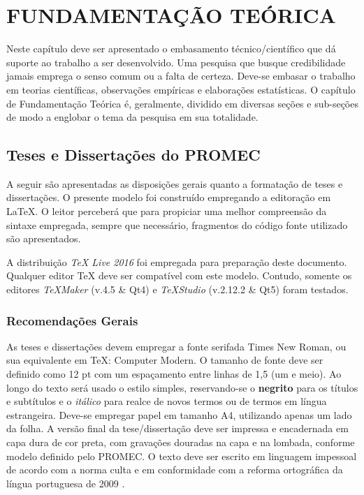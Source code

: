 \chapter{FUNDAMENTAÇÃO TEÓRICA}\label{cap:intro}

Neste capítulo deve ser apresentado o embasamento técnico/científico que dá suporte ao trabalho a ser desenvolvido. Uma pesquisa que busque credibilidade jamais emprega o senso comum ou a falta de certeza. Deve-se embasar o trabalho em teorias científicas, observações empíricas e elaborações estatísticas. O capítulo de Fundamentação Teórica é, geralmente, dividido em diversas seções e sub-seções de modo a englobar o tema da pesquisa em sua totalidade.

\section{Teses e Dissertações do PROMEC}

A seguir são apresentadas as disposições gerais quanto a formatação de teses e dissertações. O presente modelo foi construído empregando a editoração em {\LaTeX}. O leitor perceberá que para propiciar uma melhor compreensão da sintaxe empregada, sempre que necessário, fragmentos do código fonte utilizado são apresentados.

A distribuição \textit{{\TeX} Live 2016} \citep{rahtz2016livetex} foi empregada para preparação deste documento. Qualquer editor {\TeX} deve ser compatível com este modelo. Contudo, somente os editores \textit{{\TeX}Maker} (v.4.5 \& Qt4) e \textit{{\TeX}Studio} (v.2.12.2 \& Qt5) foram testados.

\subsection{Recomendações Gerais}

As teses e dissertações devem empregar a fonte serifada Times New Roman, ou sua equivalente em {\TeX}: Computer Modern. O tamanho de fonte deve ser definido como 12 pt com um espaçamento entre linhas de 1,5 (um e meio). Ao longo do texto será usado o estilo simples, reservando-se o \textbf{negrito} para os títulos e subtítulos e o \textit{itálico} para realce de novos termos ou de termos em língua estrangeira. Deve-se empregar papel em tamanho A4, utilizando apenas um lado da folha. A versão final da tese/dissertação deve ser impressa e encadernada em capa dura de cor preta, com gravações douradas na capa e na lombada, conforme modelo definido pelo PROMEC. O texto deve ser escrito em linguagem impessoal de acordo com a norma culta e em conformidade com a reforma ortográfica da língua portuguesa de 2009 \citep{bechara2012moderna}.


